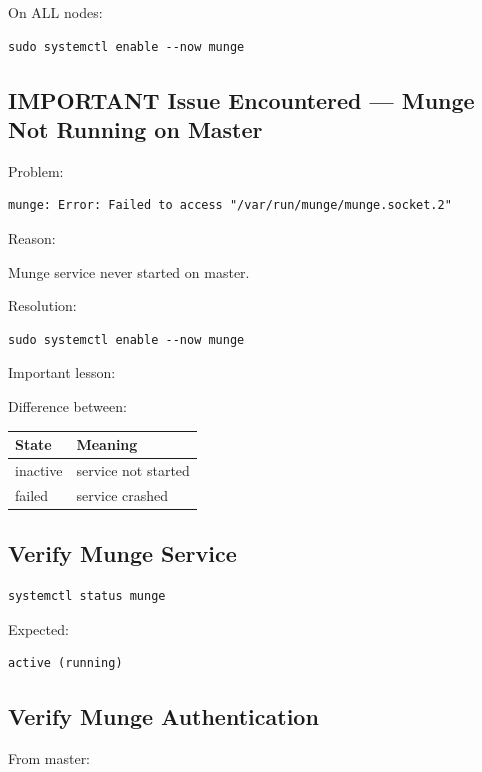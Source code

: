 \documentclass[11pt]{article}
\begin{document}
On ALL nodes:

\begin{verbatim}
sudo systemctl enable --now munge
\end{verbatim}
\subsection{IMPORTANT Issue Encountered — Munge Not Running on Master}
\label{sec:orgc95adac}

Problem:

\begin{verbatim}
munge: Error: Failed to access "/var/run/munge/munge.socket.2"
\end{verbatim}

Reason:

Munge service never started on master.

Resolution:

\begin{verbatim}
sudo systemctl enable --now munge
\end{verbatim}

Important lesson:

Difference between:

\begin{center}
\begin{tabular}{ll}
State & Meaning\\
\hline
inactive & service not started\\
failed & service crashed\\
\end{tabular}
\end{center}
\subsection{Verify Munge Service}
\label{sec:org8372f96}

\begin{verbatim}
systemctl status munge
\end{verbatim}

Expected:

\begin{verbatim}
active (running)
\end{verbatim}
\subsection{Verify Munge Authentication}
\label{sec:org542a811}

From master:
\end{document}
